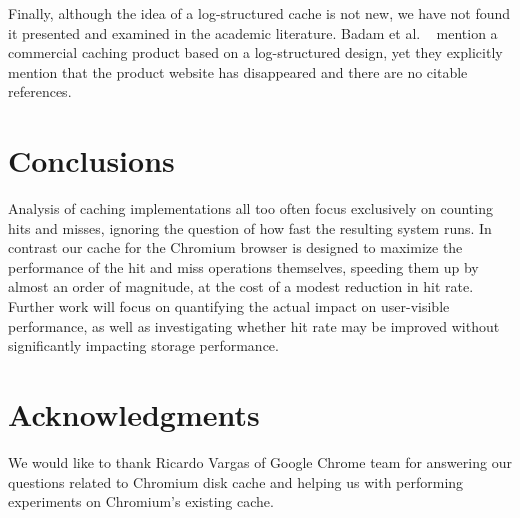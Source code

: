 \documentclass[letterpaper,twocolumn,10pt]{article}
\begin{document}
Finally, although the idea of a log-structured cache is not new, we have not
found it presented and examined in the academic literature.  Badam et
al. ~\cite{hashcache} mention a commercial caching product based on a
log-structured design, yet they explicitly mention that the product website has
disappeared and there are no citable references.

\section{Conclusions}

Analysis of caching implementations all too often focus exclusively on
counting hits and misses, ignoring the question of how fast the
resulting system runs. In contrast our cache for the Chromium browser
is designed to maximize the performance of the hit and miss operations
themselves, speeding them up by almost an order of magnitude, at the
cost of a modest reduction in hit rate. Further work will focus on
quantifying the actual impact on user-visible performance, as well as
investigating whether hit rate may be improved without significantly
impacting storage performance.

\section*{Acknowledgments}

We would like to thank Ricardo Vargas of Google Chrome team for answering our
questions related to Chromium disk cache and helping us with performing
experiments on Chromium's existing cache.


\end{document}

